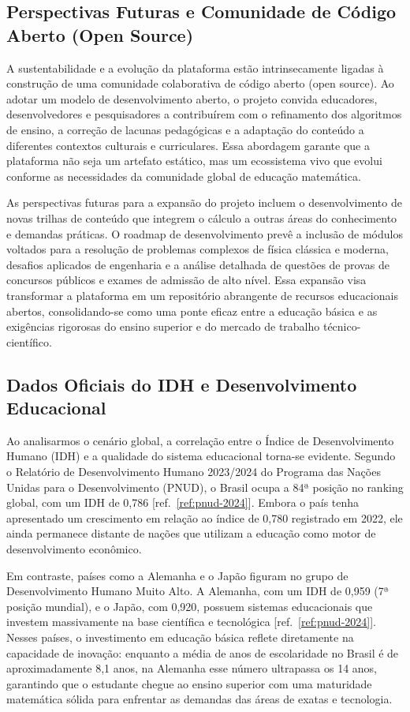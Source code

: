 \documentclass[12pt,a4paper,oneside]{article}
\begin{document}
\subsection{Perspectivas Futuras e Comunidade de Código Aberto (Open Source)}
A sustentabilidade e a evolução da plataforma estão intrinsecamente ligadas à 
construção de uma comunidade colaborativa de código aberto (open source). Ao 
adotar um modelo de desenvolvimento aberto, o projeto convida educadores, desenvolvedores 
e pesquisadores a contribuírem com o refinamento dos algoritmos de ensino, a correção de 
lacunas pedagógicas e a adaptação do conteúdo a diferentes contextos culturais e curriculares. 
Essa abordagem garante que a plataforma não seja um artefato estático, mas um ecossistema 
vivo que evolui conforme as necessidades da comunidade global de educação matemática.

As perspectivas futuras para a expansão do projeto incluem o desenvolvimento de novas trilhas 
de conteúdo que integrem o cálculo a outras áreas do conhecimento e demandas práticas. 
O roadmap de desenvolvimento prevê a inclusão de módulos voltados para a resolução de problemas 
complexos de física clássica e moderna, desafios aplicados de engenharia e a análise detalhada 
de questões de provas de concursos públicos e exames de admissão de alto nível. Essa expansão visa 
transformar a plataforma em um repositório abrangente de recursos educacionais abertos, 
consolidando-se como uma ponte eficaz entre a educação básica e as exigências rigorosas do 
ensino superior e do mercado de trabalho técnico-científico.

\subsection{Dados Oficiais do IDH e Desenvolvimento Educacional}
\label{sec:idh-desenvolvimento}

Ao analisarmos o cenário global, a correlação entre o Índice de Desenvolvimento Humano (IDH)
e a qualidade do sistema educacional torna-se evidente. Segundo o Relatório de Desenvolvimento
Humano 2023/2024 do Programa das Nações Unidas para o Desenvolvimento (PNUD), o Brasil ocupa a 
84ª posição no ranking global, com um IDH de 0,786 [ref.~\ref{ref:pnud-2024}]. Embora o país tenha 
apresentado um crescimento em relação ao índice de 0,780 registrado em 2022, ele ainda permanece distante 
de nações que utilizam a educação como motor de desenvolvimento econômico.

Em contraste, países como a Alemanha e o Japão figuram no grupo de Desenvolvimento Humano Muito Alto. 
A Alemanha, com um IDH de 0,959 (7ª posição mundial), e o Japão, com 0,920, possuem sistemas educacionais 
que investem massivamente na base científica e tecnológica [ref.~\ref{ref:pnud-2024}]. Nesses países, 
o investimento em educação básica reflete diretamente na capacidade de inovação: enquanto a média de anos de 
escolaridade no Brasil é de aproximadamente 8,1 anos, na Alemanha esse número ultrapassa os 14 anos, garantindo 
que o estudante chegue ao ensino superior com uma maturidade matemática sólida para enfrentar as demandas das 
áreas de exatas e tecnologia.
\end{document}
